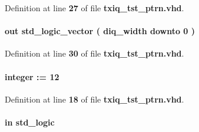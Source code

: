 Definition at line {\bf 27} of file {\bf txiq\+\_\+tst\+\_\+ptrn.\+vhd}.

\paragraph[{diq\+\_\+l}]{ {\bfseries \textcolor{keywordflow}{out}\textcolor{vhdlchar}{ }} {\bfseries \textcolor{comment}{std\+\_\+logic\+\_\+vector}\textcolor{vhdlchar}{ }\textcolor{vhdlchar}{(}\textcolor{vhdlchar}{ }\textcolor{vhdlchar}{ }\textcolor{vhdlchar}{ }\textcolor{vhdlchar}{ }{\bfseries {\bf diq\+\_\+width}} \textcolor{vhdlchar}{ }\textcolor{keywordflow}{downto}\textcolor{vhdlchar}{ }\textcolor{vhdlchar}{ } \textcolor{vhdldigit}{0} \textcolor{vhdlchar}{ }\textcolor{vhdlchar}{)}\textcolor{vhdlchar}{ }} \hspace{0.3cm}{\ttfamily [Port]}}\label{classtxiq__tst__ptrn_adfa59559758477b259c01cef13f30dc0}


Definition at line {\bf 30} of file {\bf txiq\+\_\+tst\+\_\+ptrn.\+vhd}.

\paragraph[{diq\+\_\+width}]{ {\bfseries \textcolor{vhdlchar}{ }} {\bfseries \textcolor{comment}{integer}\textcolor{vhdlchar}{ }\textcolor{vhdlchar}{ }\textcolor{vhdlchar}{\+:}\textcolor{vhdlchar}{=}\textcolor{vhdlchar}{ }\textcolor{vhdlchar}{ } \textcolor{vhdldigit}{12} \textcolor{vhdlchar}{ }} \hspace{0.3cm}{\ttfamily [Generic]}}\label{classtxiq__tst__ptrn_a72012255b2336a3619392835aa664f99}


Definition at line {\bf 18} of file {\bf txiq\+\_\+tst\+\_\+ptrn.\+vhd}.

\paragraph[{fidm}]{ {\bfseries \textcolor{keywordflow}{in}\textcolor{vhdlchar}{ }} {\bfseries \textcolor{comment}{std\+\_\+logic}\textcolor{vhdlchar}{ }} \hspace{0.3cm}{\ttfamily [Port]}}\label{classtxiq__tst__ptrn_a97ae5ad9eee26d5f984f95d151f62ec0}


